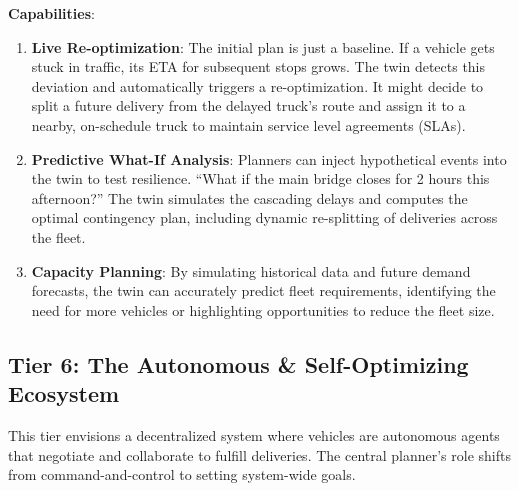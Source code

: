 \documentclass{article}
\begin{document}
\textbf{Capabilities}:
\begin{enumerate}
    \item \textbf{Live Re-optimization}: The initial plan is just a baseline. If a vehicle gets stuck in traffic, its ETA for subsequent stops grows. The twin detects this deviation and automatically triggers a re-optimization. It might decide to split a future delivery from the delayed truck's route and assign it to a nearby, on-schedule truck to maintain service level agreements (SLAs).
    \item \textbf{Predictive What-If Analysis}: Planners can inject hypothetical events into the twin to test resilience. ``What if the main bridge closes for 2 hours this afternoon?'' The twin simulates the cascading delays and computes the optimal contingency plan, including dynamic re-splitting of deliveries across the fleet.
    \item \textbf{Capacity Planning}: By simulating historical data and future demand forecasts, the twin can accurately predict fleet requirements, identifying the need for more vehicles or highlighting opportunities to reduce the fleet size.
\end{enumerate}

\subsection{Tier 6: The Autonomous \& Self-Optimizing Ecosystem}
This tier envisions a decentralized system where vehicles are autonomous agents that negotiate and collaborate to fulfill deliveries. The central planner's role shifts from command-and-control to setting system-wide goals.
\end{document}
